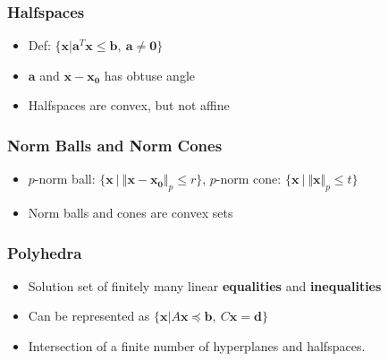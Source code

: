 \subsubsection*{Halfspaces}
\begin{itemize}
    \item Def: $\{\mathbf{x}|\mathbf{a}^T\mathbf{x} \leq \mathbf{b},~\mathbf{a}\neq\mathbf{0}\}$
    \item $\mathbf{a}$ and $\mathbf{x} - \mathbf{x_0}$ has obtuse angle
    \item Halfspaces are convex, but not affine
\end{itemize}

\subsubsection*{Norm Balls and Norm Cones}
\begin{itemize}
    \item $p$-norm ball: $\{\mathbf{x}~|~\Vert \mathbf{x} - \mathbf{x_0} \Vert_p \leq r\}$, 
        $p$-norm cone: $\{\mathbf{x}~|~\Vert \mathbf{x} \Vert_p \leq t\}$
    \item Norm balls and cones are convex sets
\end{itemize}

\subsubsection*{Polyhedra}
\begin{itemize}
    \item Solution set of finitely many linear \textbf{equalities} and \textbf{inequalities}
    \item Can be represented as $\{\mathbf{x}|A\mathbf{x} \preceq \mathbf{b},~ C\mathbf{x} = \mathbf{d} \}$
    \item Intersection of a finite number of hyperplanes and halfspaces.
\end{itemize}

